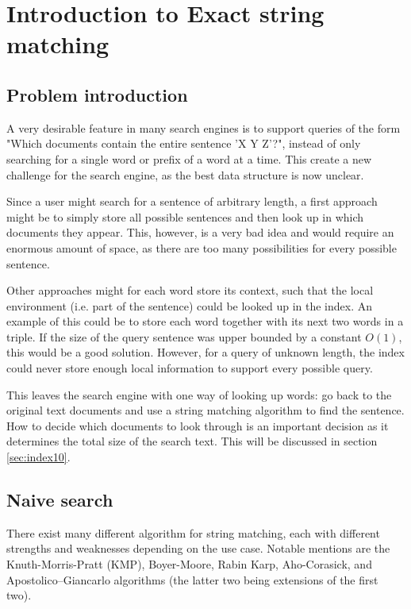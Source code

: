 \section{Introduction to Exact string matching}

\subsection{Problem introduction}

A very desirable feature in many search engines is to support queries of the form "Which documents contain the entire sentence 'X Y Z'?", instead of only searching for a single word or prefix of a word at a time. This create a new challenge for the search engine, as the best data structure is now unclear. 

Since a user might search for a sentence of arbitrary length, a first approach might be to simply store all possible sentences and then look up in which documents they appear. This, however, is a very bad idea and would require an enormous amount of space, as there are too many possibilities for every possible sentence. 

Other approaches might for each word store its context, such that the local environment (i.e. part of the sentence) could be looked up in the index. An example of this could be to store each word together with its next two words in a triple. If the size of the query sentence was upper bounded by a constant $O(1)$, this would be a good solution. However, for a query of unknown length, the index could never store enough local information to support every possible query. 


This leaves the search engine with one way of looking up words: go back to the original text documents and use a string matching algorithm to find the sentence. How to decide which documents to look through is an important decision as it determines the total size of the search text. This will be discussed in section \ref{sec:index10}. 

\subsection{Naive search}

There exist many different algorithm for string matching, each with different strengths and weaknesses depending on the use case. Notable mentions are the Knuth-Morris-Pratt (KMP), Boyer-Moore, Rabin Karp, Aho-Corasick, and Apostolico–Giancarlo algorithms (the latter two being extensions of the first two). 

